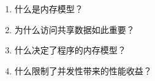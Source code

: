\begin{enumerate}
\item 什么是内存模型？
\item 为什么访问共享数据如此重要？
\item 什么决定了程序的内存模型？
\item 什么限制了并发性带来的性能收益？
\end{enumerate}
